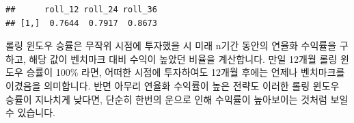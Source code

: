 \documentclass[12pt,]{book}
\newenvironment{Shaded}{\begin{snugshade}}{\end{snugshade}}
\newcommand{\DecValTok}[1]{\textcolor[rgb]{0.00,0.00,0.81}{#1}}
\newcommand{\KeywordTok}[1]{\textcolor[rgb]{0.13,0.29,0.53}{\textbf{#1}}}
\newcommand{\NormalTok}[1]{#1}
\newcommand{\OperatorTok}[1]{\textcolor[rgb]{0.81,0.36,0.00}{\textbf{#1}}}
\newcommand{\StringTok}[1]{\textcolor[rgb]{0.31,0.60,0.02}{#1}}
\begin{document}
\begin{Shaded}
\end{Shaded}

\begin{verbatim}
##      roll_12 roll_24 roll_36
## [1,]  0.7644  0.7917  0.8673
\end{verbatim}

롤링 윈도우 승률은 무작위 시점에 투자했을 시 미래 n기간 동안의 연율화 수익률을 구하고, 해당 값이 벤치마크 대비 수익이 높았던 비율을 계산합니다. 만일 12개월 롤링 윈도우 승률이 100\% 라면, 어떠한 시점에 투자하여도 12개월 후에는 언제나 벤치마크를 이겼음을 의미합니다. 반면 아무리 연율화 수익률이 높은 전략도 이러한 롤링 윈도우 승률이 지나치게 낮다면, 단순히 한번의 운으로 인해 수익률이 높아보이는 것처럼 보일 수 있습니다.
\end{document}
